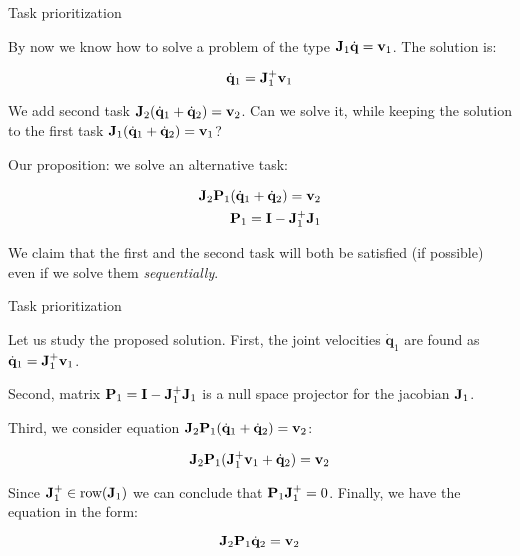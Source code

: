 \documentclass{beamer}
\newcommand{\dq} {\dot{\mathbf{q}}}
\begin{document}
\begin{frame}{Task prioritization}
	\begin{flushleft}
		
		By now we know how to solve a problem of the type $\bo{J}_1 \dq =\bo{v}_1$. The solution is:
		
		\begin{equation}
			\dq_1 = \bo{J}_1^+ \bo{v}_1
		\end{equation}
	
		We add second task $\bo{J}_2 (\dq_1 + \dq_2) =\bo{v}_2$. Can we solve it, while keeping the solution to the first task $\bo{J}_1 (\dq_1 + \dq_2) =\bo{v}_1$?
		
		\bigskip
		
		Our proposition: we solve an alternative task:
		
		\begin{align}
			\bo{J}_2 \bo{P}_1 (\dq_1 + \dq_2) =\bo{v}_2 \\
			\bo{P}_1 = \bo{I} - \bo{J}_1^+ \bo{J}_1
		\end{align}
		
		We claim that the first and the second task will both be satisfied (if possible) even if we solve them \emph{sequentially}.
		
	\end{flushleft}
\end{frame}



\begin{frame}{Task prioritization}
	\begin{flushleft}
		
		Let us study the proposed solution. First, the joint velocities $\dq_1$ are found as $\dq_1 = \bo{J}_1^+ \bo{v}_1$.
		
		\bigskip
		
		Second, matrix $\mathbf{P}_1 = \mathbf{I} - \mathbf{J}_1^+ \mathbf{J}_1$ is a null space projector for the jacobian $\mathbf{J}_1$. 
		
		\bigskip
		
		Third, we consider equation $\bo{J}_2 \bo{P}_1 (\dq_1 + \dq_2) =\bo{v}_2$:
		
		\begin{equation}
			\bo{J}_2 \bo{P}_1 (\bo{J}_1^+ \bo{v}_1 + \dq_2) =\bo{v}_2
		\end{equation}
	
		Since $\mathbf{J}_1^+ \in \text{row}(\mathbf{J}_1)$ we can conclude that $\mathbf{P}_1 \mathbf{J}_1^+ = 0$. Finally, we have the equation in the form:
		
		\begin{equation}
			\bo{J}_2 \bo{P}_1 \dq_2 =\bo{v}_2
		\end{equation}		
		
	\end{flushleft}
\end{frame}
\end{document}
